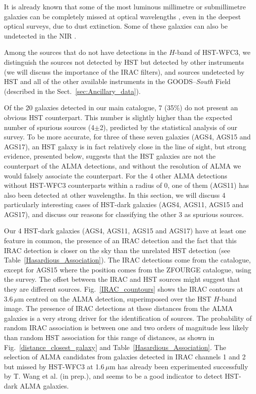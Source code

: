 \documentclass[longauth]{aa}
\begin{document}
It is already known that some of the most luminous millimetre or submillimetre galaxies can be completely missed at optical wavelengths \mbox{\citep{Wang2016}}, even in the deepest optical surveys, due to dust extinction. Some of these galaxies can also be undetected in the NIR \mbox{\citep{Wang2009}}. 

Among the sources that do not have detections in the $H$-band of HST-WFC3, we distinguish the sources not detected by HST but detected by other instruments (we will discuss the importance of the IRAC filters), and sources undetected by HST and all of the other available instruments in the GOODS--\textit{South} Field (described in the Sect.~\ref{sec:Ancillary_data}).

Of the 20 galaxies detected in our main catalogue, 7 (35\%) do not present an obvious HST counterpart. This number is slightly higher than the expected number of spurious sources (4$\pm$2), predicted by the statistical analysis of our survey. 
To be more accurate, for three of these seven galaxies (AGS4, AGS15 and AGS17), an HST galaxy is in fact relatively close in the line of sight, but strong evidence, presented below, suggests that the HST galaxies are not the counterpart of the ALMA detections, and without the resolution of ALMA we would falsely associate the counterpart. For the 4 other ALMA detections without HST-WFC3 counterparts within a radius of 0, one of them (AGS11) has also been detected at other wavelengths. In this section, we will discuss 4 particularly interesting cases of HST-dark galaxies (AGS4, AGS11, AGS15 and AGS17), and discuss our reasons for classifying the other 3 as spurious sources.

Our 4 HST-dark galaxies (AGS4, AGS11, AGS15 and AGS17) have at least one feature in common, the presence of an IRAC detection and the fact that this IRAC detection is closer on the sky than the unrelated HST detection (see Table~\ref{Hasardious_Association}). The IRAC detections come from the \mbox{\cite{Ashby2015}} catalogue, except for AGS15 where the position comes from the ZFOURGE catalogue, using the \mbox{\cite{Labbe2015}} survey. The offset between the IRAC and HST sources might suggest that they are different sources. Fig.~\ref{IRAC_countours} shows the IRAC contours at 3.6\,$\mu$m centred on the ALMA detection, superimposed over the HST $H$-band image.
The presence of IRAC detections at these distances from the ALMA galaxies is a very strong driver for the identification of sources. The probability of random IRAC association is between one and two orders of magnitude less likely than random HST association for this range of distances, as shown in Fig.~\ref{distance_closest_galaxy} and Table~\ref{Hasardious_Association}. The selection of ALMA candidates from galaxies detected in IRAC channels 1 and 2 but missed by HST-WFC3 at 1.6\,$\mu$m has already been experimented successfully by T. Wang et al. (in prep.), and seems to be a good indicator to detect HST-dark ALMA galaxies.
\end{document}
